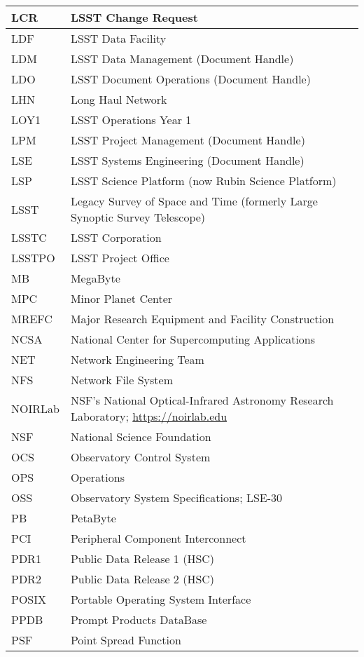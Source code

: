 \begin{longtable}{p{}p{}}
LCR & LSST Change Request \\\hline
LDF & LSST Data Facility \\\hline
LDM & LSST Data Management (Document Handle) \\\hline
LDO & LSST Document Operations (Document Handle) \\\hline
LHN & Long Haul Network \\\hline
LOY1 & LSST Operations Year 1 \\\hline
LPM & LSST Project Management (Document Handle) \\\hline
LSE & LSST Systems Engineering (Document Handle) \\\hline
LSP & LSST Science Platform (now Rubin Science Platform) \\\hline
LSST & Legacy Survey of Space and Time (formerly Large Synoptic Survey Telescope) \\\hline
LSSTC & LSST Corporation \\\hline
LSSTPO & LSST Project Office \\\hline
MB & MegaByte \\\hline
MPC & Minor Planet Center \\\hline
MREFC & Major Research Equipment and Facility Construction \\\hline
NCSA & National Center for Supercomputing Applications \\\hline
NET & Network Engineering Team \\\hline
NFS & Network File System \\\hline
NOIRLab & NSF's National Optical-Infrared Astronomy Research Laboratory; \url{https://noirlab.edu} \\\hline
NSF & National Science Foundation \\\hline
OCS & Observatory Control System \\\hline
OPS & Operations \\\hline
OSS & Observatory System Specifications; LSE-30 \\\hline
PB & PetaByte \\\hline
PCI & Peripheral Component Interconnect \\\hline
PDR1 & Public Data Release 1 (HSC) \\\hline
PDR2 & Public Data Release 2 (HSC) \\\hline
POSIX & Portable Operating System Interface \\\hline
PPDB & Prompt Products DataBase \\\hline
PSF & Point Spread Function \\\hline

\end{longtable}
